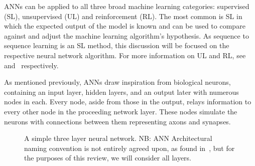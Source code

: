 ANNs can be applied to all three broad machine learning categories: supervised (SL), unsupervised (UL) and reinforcement (RL). The most common is SL in which the expected output of the model is known and can be used to compare against and adjust the machine learning algorithm's hypothesis.  As sequence to sequence learning is an SL method, this discussion will be focused on the respective neural network algorithm. For more information on UL and RL, see~\cite{Becker1996} and~\cite{Sutton1998} respectively.

As mentioned previously, ANNs draw inspiration from biological neurons, containing an input layer, hidden layers, and an output later with numerous nodes in each. Every node, aside from those in the output, relays information to every other node in the proceeding network layer. These nodes simulate the neurons with connections between them representing axons and synapses.

\begin{figure}[h]
  \centering

  \caption{A simple three layer neural network. NB: ANN Architectural naming convention is not entirely agreed upon, as found in~\cite{Fei-Fei2015}, but for the purposes of this review, we will consider all layers.}
  \label{fig:NNDiagram}
\end{figure}

